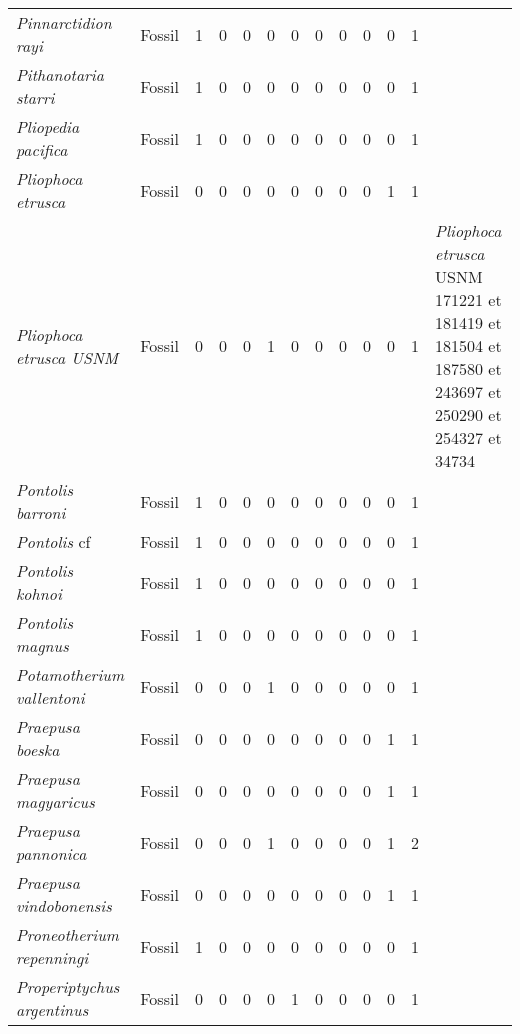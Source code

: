 \begin{longtable}{llccccccccccp{}}
\textit{Pinnarctidion rayi} &
Fossil &
1 &
0 &
0 &
0 &
0 &
0 &
0 &
0 &
0 &
1 &
\\

\textit{Pithanotaria starri} &
Fossil &
1 &
0 &
0 &
0 &
0 &
0 &
0 &
0 &
0 &
1 &
\\

\textit{Pliopedia pacifica} &
Fossil &
1 &
0 &
0 &
0 &
0 &
0 &
0 &
0 &
0 &
1 &
\\

\textit{Pliophoca etrusca} &
Fossil &
0 &
0 &
0 &
0 &
0 &
0 &
0 &
0 &
1 &
1 &
\\

\textit{Pliophoca etrusca USNM} &
Fossil &
0 &
0 &
0 &
1 &
0 &
0 &
0 &
0 &
0 &
1 &
\textit{Pliophoca etrusca} USNM 171221 et 181419 et 181504 et 187580 et 243697 et 250290 et 254327 et 34734\\

\textit{Pontolis barroni} &
Fossil &
1 &
0 &
0 &
0 &
0 &
0 &
0 &
0 &
0 &
1 &
\\

\textit{Pontolis} cf &
Fossil &
1 &
0 &
0 &
0 &
0 &
0 &
0 &
0 &
0 &
1 &
\\

\textit{Pontolis kohnoi} &
Fossil &
1 &
0 &
0 &
0 &
0 &
0 &
0 &
0 &
0 &
1 &
\\

\textit{Pontolis magnus} &
Fossil &
1 &
0 &
0 &
0 &
0 &
0 &
0 &
0 &
0 &
1 &
\\

\textit{Potamotherium vallentoni} &
Fossil &
0 &
0 &
0 &
1 &
0 &
0 &
0 &
0 &
0 &
1 &
\\

\textit{Praepusa boeska} &
Fossil &
0 &
0 &
0 &
0 &
0 &
0 &
0 &
0 &
1 &
1 &
\\

\textit{Praepusa magyaricus} &
Fossil &
0 &
0 &
0 &
0 &
0 &
0 &
0 &
0 &
1 &
1 &
\\

\textit{Praepusa pannonica} &
Fossil &
0 &
0 &
0 &
1 &
0 &
0 &
0 &
0 &
1 &
2 &
\\

\textit{Praepusa vindobonensis} &
Fossil &
0 &
0 &
0 &
0 &
0 &
0 &
0 &
0 &
1 &
1 &
\\

\textit{Proneotherium repenningi} &
Fossil &
1 &
0 &
0 &
0 &
0 &
0 &
0 &
0 &
0 &
1 &
\\

\textit{Properiptychus argentinus} &
Fossil &
0 &
0 &
0 &
0 &
1 &
0 &
0 &
0 &
0 &
1 &
\\


\end{longtable}
